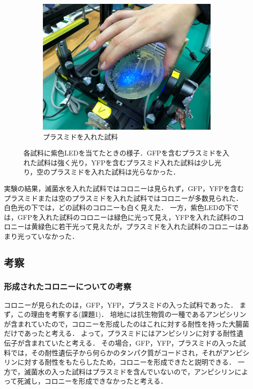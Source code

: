 \documentclass[a4paper,11pt, titlepage]{jsarticle}
\begin{document}
\begin{figure}[htbp]
\begin{subfigure}{0.3\columnwidth}
        \includegraphics[width=\columnwidth]{plasmid.jpg}
        \caption{プラスミドを入れた試料}
        \label{fig:plasmid}
    \end{subfigure}    
    \caption{各試料に紫色LEDを当てたときの様子．GFPを含むプラスミドを入れた試料は強く光り，YFPを含むプラスミド入れた試料は少し光り，空のプラスミドを入れた試料は光らなかった．}
    \label{fig:purple_led}
  \end{figure}

実験の結果，滅菌水を入れた試料ではコロニーは見られず，GFP，YFPを含むプラスミドまたは空のプラスミドを入れた試料ではコロニーが多数見られた．
白色光の下では，どの試料のコロニーも白く見えた．
一方，紫色LEDの下では，GFPを入れた試料のコロニーは緑色に光って見え，YFPを入れた試料のコロニーは黄緑色に若干光って見えたが，プラスミドを入れた試料のコロニーはあまり光っていなかった．

\subsection{考察}
\subsubsection{形成されたコロニーについての考察}
コロニーが見られたのは，GFP，YFP，プラスミドの入った試料であった．
まず，この理由を考察する(課題1)．
培地には抗生物質の一種であるアンピシリンが含まれていたので，コロニーを形成したのはこれに対する耐性を持った大腸菌だけであったと考える．
よって，プラスミドにはアンピシリンに対する耐性遺伝子が含まれていたと考える．
その場合，GFP，YFP，プラスミドの入った試料では，その耐性遺伝子から何らかのタンパク質がコードされ，それがアンピシリンに対する耐性をもたらしたため，コロニーを形成できたと説明できる．
一方で，滅菌水の入った試料はプラスミドを含んでいないので，アンピシリンによって死滅し，コロニーを形成できなかったと考える．
\end{document}
